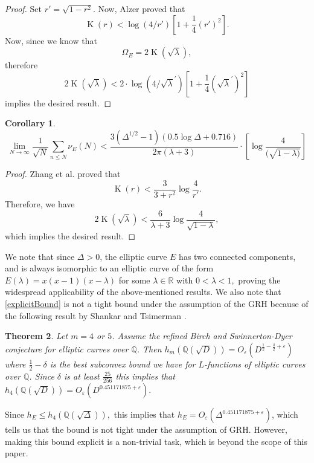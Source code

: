 \documentclass[12pt]{amsart}
\theoremstyle{plain}
\newtheorem{thm}{Theorem}
\newtheorem{cor}[thm]{Corollary}
\theoremstyle{definition}
\theoremstyle{remark}
\numberwithin{equation}{section}
\numberwithin{thm}{section}
\theoremstyle{named}
\theoremstyle{named}
\begin{document}
\begin{proof}
  Set $r' = \sqrt{1 - r^2}.$ Now, {Alzer} \cite{1998MPCPS.124..309A} proved that $$\operatorname{K}(r) < {\log(4/r')} \left[1 + \frac{1}{4}(r')^2 \right].$$Now, since we know that $$\Omega_E = 2\operatorname{K}(\sqrt \lambda),$$ therefore $$2 \operatorname{K}(\sqrt{\lambda}) < 2 \cdot {\log(4/\sqrt{\lambda}^{'})} \left[1 + \frac{1}{4}(\sqrt{\lambda}^{'})^2 \right]$$ implies the desired result.
\end{proof}

\begin{cor}
    $$ \lim_{N \to \infty} \frac{1}{\sqrt{N}} \sum_{n \le N} \nu_E(N) < \frac{3(\Delta^{1/2} - 1)(0.5 \log \Delta + 0.716)}{ 2\pi (\lambda + 3)} \cdot \left[\log \frac{4}{(\sqrt{1- \lambda)}}\right]$$
\end{cor}
\begin{proof}
   {Zhang et al.} \cite{1c830260f0b34c899998c8f62fd396e3} proved that $$ \operatorname{K}(r) < \frac{3}{3 + r^2} \log \frac{4}{r'}.$$ Therefore, we have$$ 2 \operatorname{K}(\sqrt{\lambda}) < \frac{6}{\lambda + 3} \log \frac{4}{\sqrt{1 - \lambda}},$$ which implies the desired result. 
\end{proof}
We note that since $\Delta > 0$, the elliptic curve $E$ has two connected components, and  is always isomorphic to an elliptic curve of the form $E(\lambda) = x(x-1)(x- \lambda)$ for some $\lambda \in \mathbb{R}$ with $0 < \lambda <1,$ proving the widespread applicability of the above-mentioned results. We also note that \ref{explicitBound} is not a tight bound under the assumption of the {GRH} because of the following result by {Shankar and Tsimerman }\cite{shankar2023nontrivial}.
\begin{thm}\label{thm: mainquadratic}
    Let $m=4$ or $5$.
Assume the refined Birch and Swinnerton-Dyer conjecture for elliptic curves over $\mathbb Q$. Then $h_m(\mathbb Q(\sqrt{D}))=O_{\varepsilon}(D^{\frac12-\frac{\delta}2+\varepsilon})$ where $\frac12-\delta$ is the best subconvex bound we have for $L$-functions of elliptic curves over $\mathbb Q$. Since $\delta $ is at least $ \frac{25}{256}$ this implies that $h_4(\mathbb{Q} ( \sqrt{D})) = O_{\varepsilon} (D^{0.451171875 + \varepsilon} ).$
\end{thm}
Since $h_E \leq h_4(\mathbb{Q}(\sqrt{\Delta}) ),$ this implies that $ h_E = O_{\varepsilon} (\Delta^{0.451171875 + \varepsilon})$, which tells us that the bound is not tight under the assumption of {GRH}. However, making this bound explicit is a non-trivial task, which is beyond the scope of this paper. 
\end{document}
